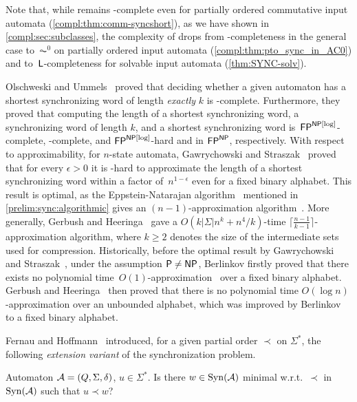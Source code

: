 Note that, while \DFASWS
remains \NP-complete even for partially ordered commutative input automata (\cref{compl:thm:comm-syncshort}),
as we have shown in \cref{compl:sec:subclasses}, the complexity of \DFAS 
drops from \NL-completeness in the general case
to~$\AC^0$ on partially ordered input automata (\cref{compl:thm:pto_sync_in_AC0})
and to~$\textsf{L}$-completeness for solvable input automata (\cref{thm:SYNC-solv}).

Olschweski and Ummels~\cite{DBLP:conf/mfcs/OlschewskiU10}
proved that deciding whether a given automaton
has a shortest synchronizing word of length \emph{exactly} $k$
is \DP-complete. Furthermore, they proved
that computing the length of a shortest synchronizing word,
a synchronizing word of length $k$,
and a shortest synchronizing word
is~$\textup{\textsf{FP}}^{\textup{\textsf{NP}}[\log]}$-complete, \FNP-complete, and $\textup{\textsf{FP}}^{\textup{\textsf{NP}}[\log]}$-hard and in $\textup{\textsf{FP}}^{\textup{\textsf{NP}}}$, respectively.
With respect to approximability, for $n$-state automata,
Gawrychowski and Straszak~\cite{DBLP:conf/mfcs/GawrychowskiS15}
proved that for every $\epsilon > 0$
it is \NP-hard to approximate the length of a shortest
synchronizing word within a factor of~$n^{1 - \epsilon}$ even for a fixed binary alphabet.
This result is optimal, as the Eppstein-Natarajan algorithm~\cite{Eppstein90,DBLP:conf/focs/Natarajan86}
mentioned in \cref{prelim:sync:algorithmic} 
gives an $(n-1)$-approximation algorithm~\cite{DBLP:conf/wia/GerbushH10}.
More generally, Gerbush and Heeringa~\cite{DBLP:conf/wia/GerbushH10} 
gave a $O(k|\Sigma|n^k + n^4/k)$-time $\lceil \frac{n-1}{k-1} \rceil$-approximation algorithm, where $k \ge 2$ 
denotes the size of the intermediate sets used for compression.
Historically, before the optimal result by Gawrychowski and Straszak~\cite{DBLP:conf/mfcs/GawrychowskiS15},
under the assumption $\textup{\textsf{P}} \ne \textup{\textsf{NP}}$, 
Berlinkov firstly proved 
that there exists no polynomial time~$O(1)$-approximation~\cite{DBLP:conf/csr/Berlinkov10,DBLP:journals/mst/Berlinkov14}
over a fixed binary alphabet.
Gerbush and Heeringa~\cite{DBLP:conf/wia/GerbushH10} 
then proved that there is no polynomial time $O(\log n)$-approximation
over an unbounded alphabet, which
was improved by Berlinkov~\cite{DBLP:conf/dlt/Berlinkov14} 
to a fixed binary alphabet.

Fernau and Hoffmann~\cite{FernauHoffmann19} introduced, for a given partial order $\prec$ on $\Sigma^*$,
the following \emph{extension variant}
of the synchronization problem.

{Automaton $\mathcal A = (Q, \Sigma, \delta)$, $u \in \Sigma^*$.}
{Is there $w \in \operatorname{Syn}(\mathcal A)$ minimal w.r.t.~$\prec$ in $\operatorname{Syn}(\mathcal A)$ such that $u \prec w$?} 

